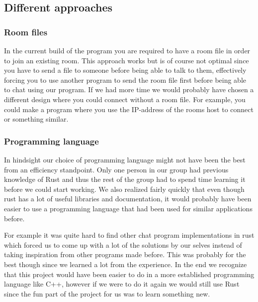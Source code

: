\documentclass[12pt, a4paper]{article}
\begin{document}
\subsection{Different approaches}
\subsubsection{Room files}
In the current build of the program you are required to have a room file in order to join an existing room. This approach works but is of course not optimal since you have to send a file to someone before being able to talk to them, effectively forcing you to use another program to send the room file first before being able to chat using our program. If we had more time we would probably have chosen a different design where you could connect without a room file. For example, you could make a program where you use the IP-address of the rooms host to connect or something similar. 


\subsubsection{Programming language}

In hindsight our choice of programming language might not have been the best from an efficiency standpoint. Only one person in our group had previous knowledge of Rust and thus the rest of the group had to spend time learning it before we could start working. We also realized fairly quickly that even though rust has a lot of useful libraries and documentation, it would probably have been easier to use a programming language that had been used for similar applications before. 

For example it was quite hard to find other chat program implementations in rust which forced us to come up with a lot of the solutions by our selves instead of taking inspiration from other programs made before. This was probably for the best though since we learned a lot from the experience. In the end we recognize that this project would have been easier to do in a more established programming language like C++, however if we were to do it again we would still use Rust since the fun part of the project for us was to learn something new.
\end{document}
